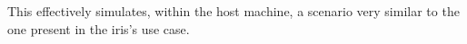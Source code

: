 \documentclass[11pt,twoside,a4paper]{report}
\begin{document}
This effectively simulates, within the host machine, a scenario very similar to the one present in the \ac{iris}'s use case.

%
%
\cleardoublepage
\iffalse
\else






\cleardoublepage
\end{document}
